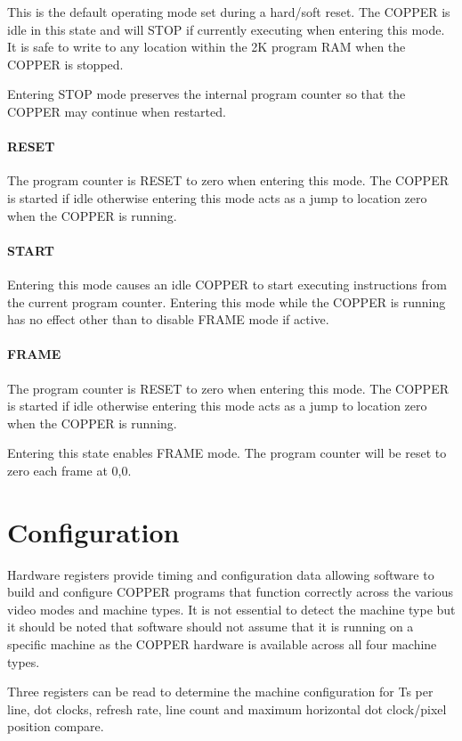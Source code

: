 This is the default operating mode set during a hard/soft reset. The
COPPER is idle in this state and will STOP if currently executing when
entering this mode. It is safe to write to any location within the 2K
program RAM when the COPPER is stopped.

Entering STOP mode preserves the internal program counter so that the
COPPER may continue when restarted.

\paragraph{RESET}

The program counter is RESET to zero when entering this mode. The
COPPER is started if idle otherwise entering this mode acts as a jump
to location zero when the COPPER is running.

\paragraph{START}

Entering this mode causes an idle COPPER to start executing
instructions from the current program counter. Entering this mode
while the COPPER is running has no effect other than to disable FRAME
mode if active.

\paragraph{FRAME}

The program counter is RESET to zero when entering this mode. The
COPPER is started if idle otherwise entering this mode acts as a jump
to location zero when the COPPER is running.

Entering this state enables FRAME mode. The program counter will be
reset to zero each frame at 0,0.

\section{Configuration}

Hardware registers provide timing and configuration data allowing
software to build and configure COPPER programs that function
correctly across the various video modes and machine types. It is not
essential to detect the machine type but it should be noted that
software should not assume that it is running on a specific machine as
the COPPER hardware is available across all four machine types.

Three registers can be read to determine the machine configuration for
Ts per line, dot clocks, refresh rate, line count and maximum
horizontal dot clock/pixel position compare.

